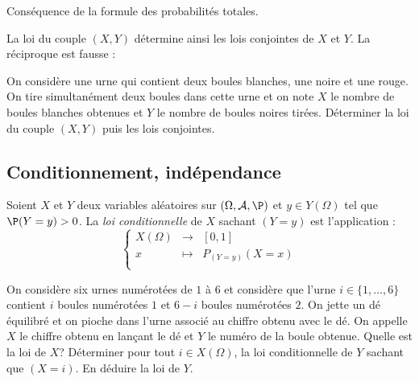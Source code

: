 \documentclass[a4paper,10pt]{report}
\begin{document}
\begin{preuve} Conséquence de la formule des probabilités totales.
%
\end{preuve}
\medskip

\begin{att} La loi du couple $(X,Y)$ détermine ainsi les lois conjointes de $X$ et $Y$. La réciproque est fausse :

\vspace{5cm}
\end{att}

\begin{exa} On considère une urne qui contient deux boules blanches, une noire et une rouge. On tire simultanément deux boules dans cette urne et on note $X$ le nombre de boules blanches obtenues et $Y$ le nombre de boules noires tirées. Déterminer la loi du couple $(X,Y)$ puis les lois conjointes.
\end{exa}
\subsection{Conditionnement, indépendance}

\begin{defin} Soient $X$ et $Y$ deux variables aléatoires sur $(\Omega, \mathcal{A}, \P)$ et $y \in Y(\Omega)$ tel que $\P(Y=y)>0$. La \textit{loi conditionnelle} de $X$ sachant $(Y=y)$ est l'application :
$$ \left\lbrace \begin{array}{ccl}
X(\Omega) & \longrightarrow & [0,1] \\
x & \longmapsto & P_{(Y=y)}(X=x) \\
\end{array}\right.$$
\end{defin}

\begin{ex} On considère six urnes numérotées de $1$ à $6$ et considère que l'urne $i \in \lbrace 1, \ldots, 6 \rbrace$ contient $i$ boules numérotées $1$ et $6-i$ boules numérotées $2$. On jette un dé équilibré et on pioche dans l'urne associé au chiffre obtenu avec le dé. On appelle $X$ le chiffre obtenu en lançant le dé et $Y$ le numéro de la boule obtenue. Quelle est la loi de $X$? Déterminer pour tout $i \in X(\Omega)$, la loi conditionnelle de $Y$ sachant que $(X=i)$. En déduire la loi de $Y$.

\vspace{10cm}
\end{ex}
\end{document}
